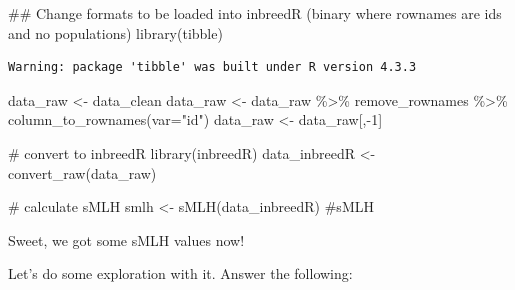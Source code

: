 \documentclass[
  letterpaper,
  DIV=11,
  numbers=noendperiod]{scrreprt}
\newenvironment{Shaded}{}{}
\newcommand{\AttributeTok}[1]{\textcolor[rgb]{0.84,0.23,0.29}{#1}}
\newcommand{\CommentTok}[1]{\textcolor[rgb]{0.42,0.45,0.49}{#1}}
\newcommand{\DecValTok}[1]{\textcolor[rgb]{0.00,0.36,0.77}{#1}}
\newcommand{\DocumentationTok}[1]{\textcolor[rgb]{0.42,0.45,0.49}{#1}}
\newcommand{\FunctionTok}[1]{\textcolor[rgb]{0.44,0.26,0.76}{#1}}
\newcommand{\NormalTok}[1]{\textcolor[rgb]{0.14,0.16,0.18}{#1}}
\newcommand{\OtherTok}[1]{\textcolor[rgb]{0.44,0.26,0.76}{#1}}
\newcommand{\SpecialCharTok}[1]{\textcolor[rgb]{0.00,0.36,0.77}{#1}}
\newcommand{\StringTok}[1]{\textcolor[rgb]{0.01,0.18,0.38}{#1}}
\begin{document}
\begin{tcolorbox}[enhanced jigsaw, arc=.35mm, left=2mm, titlerule=0mm, rightrule=.15mm, colframe=quarto-callout-tip-color-frame, coltitle=black, colback=white, opacityback=0, bottomtitle=1mm, bottomrule=.15mm, colbacktitle=quarto-callout-tip-color!10!white, breakable, title=\textcolor{quarto-callout-tip-color}{\faLightbulb}\hspace{0.5em}{Code and answer}, toptitle=1mm, toprule=.15mm, opacitybacktitle=0.6, leftrule=.75mm]

\begin{Shaded}
\begin{Highlighting}[]
\DocumentationTok{\#\# Change formats to be loaded into inbreedR (binary where rownames are id\textquotesingle{}s and no populations)}
\FunctionTok{library}\NormalTok{(tibble)}
\end{Highlighting}
\end{Shaded}

\begin{verbatim}
Warning: package 'tibble' was built under R version 4.3.3
\end{verbatim}

\begin{Shaded}
\begin{Highlighting}[]
\NormalTok{data\_raw }\OtherTok{\textless{}{-}}\NormalTok{ data\_clean}
\NormalTok{data\_raw }\OtherTok{\textless{}{-}}\NormalTok{ data\_raw }\SpecialCharTok{\%\textgreater{}\%}\NormalTok{ remove\_rownames }\SpecialCharTok{\%\textgreater{}\%} \FunctionTok{column\_to\_rownames}\NormalTok{(}\AttributeTok{var=}\StringTok{"id"}\NormalTok{)}
\NormalTok{data\_raw }\OtherTok{\textless{}{-}}\NormalTok{ data\_raw[,}\SpecialCharTok{{-}}\DecValTok{1}\NormalTok{]}

\CommentTok{\# convert to inbreedR}
\FunctionTok{library}\NormalTok{(inbreedR)}
\NormalTok{data\_inbreedR }\OtherTok{\textless{}{-}} \FunctionTok{convert\_raw}\NormalTok{(data\_raw)}

\CommentTok{\# calculate sMLH}
\NormalTok{smlh }\OtherTok{\textless{}{-}} \FunctionTok{sMLH}\NormalTok{(data\_inbreedR) }\CommentTok{\#sMLH}
\end{Highlighting}
\end{Shaded}

\end{tcolorbox}

Sweet, we got some sMLH values now!

Let's do some exploration with it. Answer the following:
\end{document}
